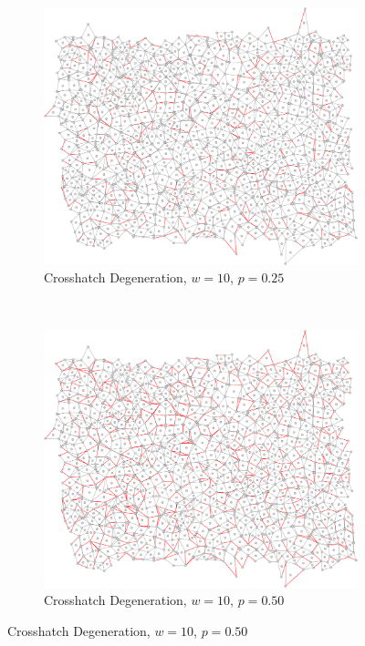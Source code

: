 \documentclass[a4paper,11pt]{report}
\begin{document}
\begin{figure}[htp]
\centering
\begin{subfigure}[t]{0.4\textwidth}
  \includegraphics[width=\textwidth]{ch6_figs/cross_hatch_p25_w10}
  \caption{Crosshatch Degeneration, $w=10$, $p=0.25$}

\end{subfigure}
~
\begin{subfigure}[t]{0.4\textwidth}
  \centering
  \includegraphics[width=\textwidth]{ch6_figs/cross_hatch_p50_w10}
  \caption{Crosshatch Degeneration, $w=10$, $p=0.50$}


\end{subfigure}
\end{figure}
\end{document}

